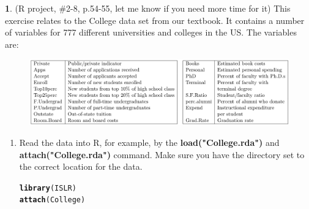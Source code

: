 \documentclass[12pt,fleqn]{article}\usepackage[]{graphicx}\usepackage[]{color}
\makeatletter
\newcommand{\hlstd}[1]{\textcolor[rgb]{0.345,0.345,0.345}{#1}}%
\newcommand{\hlkwd}[1]{\textcolor[rgb]{0.737,0.353,0.396}{\textbf{#1}}}%
\newenvironment{kframe}{%
 \def\at@end@of@kframe{}%
 \ifinner\ifhmode%
  \def\at@end@of@kframe{\end{minipage}}%
  \begin{minipage}{\columnwidth}%
 \fi\fi%
 \def\FrameCommand##1{\hskip\@totalleftmargin \hskip-\fboxsep
 \colorbox{shadecolor}{##1}\hskip-\fboxsep
     \hskip-\linewidth \hskip-\@totalleftmargin \hskip\columnwidth}%
 \MakeFramed {\advance\hsize-\width
   \@totalleftmargin\z@ \linewidth\hsize
   \@setminipage}}%
 {\par\unskip\endMakeFramed%
 \at@end@of@kframe}
\newenvironment{knitrout}{}{} %
\theoremstyle{definition}
\newtheorem{problem}{}
\makeatother
\begin{document}
	\begin{problem}
	  (R project, \#2-8, p.54-55, let me know if you need more time for it) This exercise relates to the College data set from our textbook. It contains a number of variables for 777 different universities and colleges in the US. The variables are:
	  \begin{figure}[h!]
	  \centering
	    \includegraphics[width=\linewidth]{chart2.png}
	  \end{figure}
	    \begin{enumerate}
	      \item Read the data into R, for example, by the \textbf{load("College.rda")} and \textbf{attach("College.rda")} command. Make sure you have the directory set to the correct location for the data.
\begin{knitrout}
\color{fgcolor}\begin{kframe}
\begin{alltt}
\hlkwd{library}\hlstd{(ISLR)}
\hlkwd{attach}\hlstd{(College)}
\end{alltt}
\end{kframe}
\end{knitrout}
	      

\end{enumerate}
\end{problem}
\end{document}
